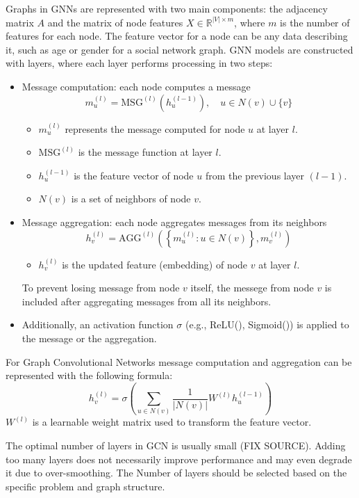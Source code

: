 Graphs in GNNs are represented with two main components: the adjacency matrix $A$ and the matrix of node features $X \in \mathbb{R}^{|V| \times m}$, where $m$ is the number of features for each node. The feature vector for a node can be any data describing it, such as age or gender for a social network graph. GNN models are constructed with layers, where each layer performs processing in two steps:
\begin{itemize}
    \item Message computation: each node computes a message 
        \[m_u^{(l)} = \text{MSG}^{(l)}(h_u^{(l-1)}), \quad u \in N(v) \cup \{v\}\]
        \begin{itemize}
            \item $m_u^{(l)}$ represents the message computed for node $u$ at layer $l$.
            \item $\text{MSG}^{(l)}$ is the message function at layer $l$.
            \item $h_u^{(l-1)}$ is the feature vector of node $u$ from the previous layer $(l-1)$.
            \item $N(v)$ is a set of neighbors of node $v$.
        \end{itemize}
    \item Message aggregation: each node aggregates messages from its neighbors
        \[h_v^{(l)} = \text{AGG}^{(l)}\left(\left\{ m_u^{(l)} : u \in N(v) \right\}, m_v^{(l)}\right)\]
        \begin{itemize}
            \item $h_v^{(l)}$ is the updated feature (embedding) of node $v$ at layer $l$. 
        \end{itemize}
        To prevent losing message from node $v$ itself, the messege from node $v$ is included after aggregating messages from all its neighbors.   
    \item Additionally, an activation function $\sigma$ (e.g., ReLU(), Sigmoid()) is applied to the message or the aggregation.
\end{itemize}

For Graph Convolutional Networks message computation and aggregation can be represented with the following formula:
\[h_v^{(l)} = \sigma \left( \sum_{u \in N(v)} \frac{1}{|N(v)|} W^{(l)} h_u^{(l-1)} \right)\]
$W^{(l)}$ is a learnable weight matrix used to transform the feature vector.

The optimal number of layers in GCN is usually small (FIX SOURCE). Adding too many layers does not necessarily improve performance and may even degrade it due to over-smoothing. The Number of layers should be selected based on the specific problem and graph structure.

